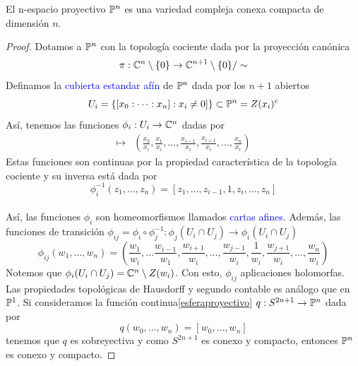     \begin{propo}\label{n-espacio}
        El n-espacio proyectivo $\mathbb{P}^n$ es una variedad compleja conexa compacta de dimensión $n$. 
    \end{propo}
    
    \begin{proof}
        Dotamos a $\mathbb{P}^n$ con la topología cociente dada por la proyección canónica
        \begin{equation*}
            \pi:\mathbb{C}^n\setminus \{0\} \to \mathbb{C}^{n+1}\setminus\{0\}/\sim
        \end{equation*}
        Definamos la \textcolor{blue}{cubierta estandar afín} de $\mathbb{P}^n$ dada por los $n+1$ abiertos
        \begin{equation*}
            U_i=\{[x_0:\cdots:x_n]:x_i\neq 0]\}\subset \mathbb{P}^n=Z(x_i)^c
        \end{equation*}
        Así, tenemos las funciones $\phi_i:U_i\to\mathbb{C}^n$ dadas por
        \begin{align*}
            [x_0:x_1:\dots:x_n]\mapsto & \left( \frac{x_0}{x_i},\frac{x_1}{x_i},\dots, \frac{x_{i-1}}{x_i},\frac{x_{i+1}}{x_i},\dots,\frac{x_n}{x_i}\right)
        \end{align*} 
        Estas funciones son continuas por la propiedad característica de la topología cociente \parencite[Teo. 3.70 Pg. 70]{lee2010introduction} y su inversa está dada por
        \begin{equation*}
            \phi_{i}^{-1}(z_1,\dots,z_n)=[z_1,\dots,z_{i-1},1,z_i,\dots,z_n]
        \end{equation*}\\
        Así, las funciones $\phi_i$ son homeomorfismos llamados \textcolor{blue}{cartas afines}.
         Además, las funciones de transición $\phi_{ij}=\phi_i\circ\phi_j^{-1}:\phi_j(U_i\cap U_j)\to\phi_i(U_i\cap U_j)$
        \begin{equation*}
            \phi_{ij}(w_1,\dots,w_n)=\left(\frac{w_1}{w_i},\dots \frac{w_{i-1}}{w_1},\frac{w_{i+1}}{w_i},\dots,\frac{w_{j-1}}{w_i},\frac{1}{w_i},\frac{w_{j+1}}{w_i},\dots,\frac{w_n}{w_i} \right)
        \end{equation*}
        Notemos que $\phi_i(U_i \cap U_j)=\mathbb{C}^n\setminus Z(w_i)$. Con esto, $\phi_{ij}$ aplicaciones holomorfas.\\
        Las propiedades topológicas de Hausdorff y segundo contable es análogo que en $\mathbb{P}^1$. Si consideramos la función continua\ref{esferaproyectivo} $q:S^{2n+1}\to\mathbb{P}^n$ dada por 
        \begin{equation*}
            q(w_0,\dots,w_n)=[w_0,\dots,w_n]
        \end{equation*}
        tenemos que $q$ es sobreyectiva y como $S^{2n+1}$ es conexo y compacto, entonces $\mathbb{P}^n$ es conexo y compacto.
    \end{proof}
    
